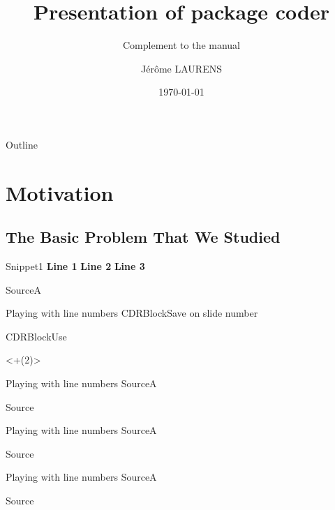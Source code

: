 \documentclass{beamer}
\title{Presentation of package \textsf{coder}}
\subtitle
{Complement to the manual}
\author[Author, Another] %
{Jérôme LAURENS}
\institute[Universities of Somewhere and Elsewhere] %
{
  Institut de mathématiques de Bourgogne\\
  Université de Bourgogne, France
}
\date %
{\today}
\begin{document}
\begin{frame}
  \titlepage
\end{frame}

\begin{frame}{Outline}
  \tableofcontents
\end{frame}

\section{Motivation}

\subsection{The Basic Problem That We Studied}

\begin{CDRBlockSave}{Snippet1}
\textbf{Line 1}
\textbf{Line 2}
\textbf{Line 3}
\end{CDRBlockSave}
\makeatletter
\newcommand{\MyCDRNumberMainA}[1]{
  \setlength{\unitlength}{1cm}
  \begin{picture}(0,0)
  \put(-1,0){\llap{\ifthenelse{#1=1}{\emoji{t-rex}}
    {\ifthenelse{#1=2}{\emoji{penguin}}{\emoji{whale}}}%
  } }
  \end{picture}
  \ifthenelse{#1=\beamer@slidenumber}{%
    \color{red}\bfseries}{}#1
}
\makeatother
\begin{CDRBlockSave}{SourceA}
\makeatletter
\newcommand{\MyCDRNumberMainA}[1]{
  \setlength{\unitlength}{1cm}
  \begin{picture}(0,0)
  \put(-1,0){\llap{\ifthenelse{#1=1}{\emoji{t-rex}}
    {\ifthenelse{#1=2}{\emoji{penguin}}{\emoji{whale}}}%
  } }
  \end{picture}
  \ifthenelse{#1=\beamer@slidenumber}{%
    \color{red}\bfseries}{}#1
}
\makeatother
\end{CDRBlockSave}

\begin{frame}
{Playing with line numbers}
{CDRBlockSave on slide number \insertslidenumber}
\begin{block}{CDRBlockUse}
\renewcommand{\CDRNumberMain}{\MyCDRNumberMainA}
\end{block}
\only<+(2)>{}
\end{frame}
\begin{frame}
{Playing with line numbers}
{SourceA}
\begin{block}{Source}
\end{block}
\end{frame}
\begin{frame}
{Playing with line numbers}
{SourceA}
\begin{block}{Source}
\end{block}
\end{frame}
\begin{frame}
{Playing with line numbers}
{SourceA}
\begin{block}{Source}
\end{block}
\end{frame}
\end{document}
